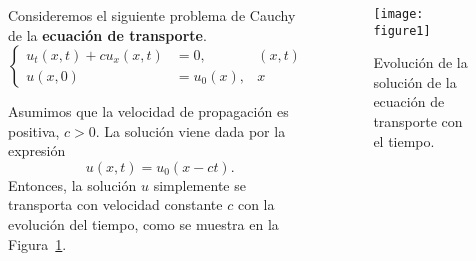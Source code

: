 \begin{frame}
    \frametitle{\secname}


    \begin{columns}
        \begin{column}{0.60\textwidth}
            \begin{example}
                Consideremos el siguiente problema de Cauchy de la
                \textbf{ecuación de transporte}.
                \begin{equation*}
                    \left\{
                    \begin{aligned}
                        u_{t}
                        \left(x,t\right)+
                        c
                        u_{x}
                        \left(x,t\right)
                                             & =
                        0,                   &
                        \left(x,t\right)     & \in
                        \mathbb{R}\times
                        \left(0,+\infty\right),               \\
                        u\left(x,0\right)    & =
                        u_{0}\left(x\right), &
                        x                    & \in\mathbb{R}.
                    \end{aligned}
                    \right.
                \end{equation*}

                Asumimos que la velocidad de propagación es positiva, $c>0$.
                La solución viene dada por la expresión
                \begin{equation*}
                    u\left(x,t\right)=u_{0}\left(x-ct\right).
                \end{equation*}
                Entonces, la solución $u$ simplemente se transporta con velocidad
                constante $c$ con la evolución del tiempo, como se muestra en
                la Figura~\ref{fig:1}.
            \end{example}
        \end{column}
        \begin{column}{0.36\textwidth}
            \begin{figure}[ht!]
                \centering
                \texttt{[image: figure1]}
                \caption{
                    Evolución de la solución de la ecuación de transporte con el
                    tiempo.
                }
                \label{fig:1}
            \end{figure}
        \end{column}
    \end{columns}
\end{frame}

